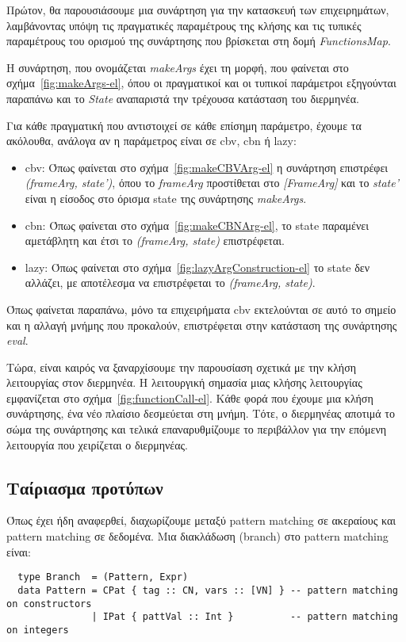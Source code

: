 \documentclass[diploma]{softlab-thesis}
\begin{document}
  
Πρώτον, θα παρουσιάσουμε μια συνάρτηση για την κατασκευή των επιχειρημάτων, λαμβάνοντας υπόψη τις πραγματικές παραμέτρους της κλήσης
και τις τυπικές παραμέτρους του ορισμού της συνάρτησης που βρίσκεται στη δομή \textit{FunctionsMap}.

  
Η συνάρτηση, που ονομάζεται \textit{makeArgs} έχει τη μορφή, που φαίνεται στο σχήμα~\ref{fig:makeArgs-el},
όπου οι πραγματικοί και οι τυπικοί παράμετροι εξηγούνται παραπάνω και το \textit{State} αναπαριστά την τρέχουσα κατάσταση του διερμηνέα.

Για κάθε πραγματική που αντιστοιχεί σε κάθε επίσημη παράμετρο, έχουμε τα ακόλουθα, ανάλογα
αν η παράμετρος είναι σε cbv, cbn ή lazy:
\begin{itemize}
\item cbv: Όπως φαίνεται στο σχήμα~\ref{fig:makeCBVArg-el} η συνάρτηση επιστρέφει \textit{(frameArg, state')}, όπου το
\textit{frameArg} προστίθεται στο \textit{[FrameArg]} και το \textit{state'} είναι η είσοδος στο όρισμα state της συνάρτησης
\textit{makeArgs}.
\item cbn: Όπως φαίνεται στο σχήμα~\ref{fig:makeCBNArg-el}, το state παραμένει αμετάβλητη και έτσι το  
\textit{(frameArg, state)} επιστρέφεται.
\item lazy: Όπως φαίνεται στο σχήμα~\ref{fig:lazyArgConstruction-el} το state δεν αλλάζει, με αποτέλεσμα  
να επιστρέφεται το \textit{(frameArg, state)}.
\end{itemize}
  
Όπως φαίνεται παραπάνω, μόνο τα επιχειρήματα cbv εκτελούνται σε αυτό το σημείο και η αλλαγή μνήμης που προκαλούν,
επιστρέφεται στην κατάσταση της συνάρτησης \textit{eval}.

Τώρα, είναι καιρός να ξαναρχίσουμε την παρουσίαση σχετικά με την κλήση λειτουργίας στον διερμηνέα.
Η λειτουργική σημασία μιας κλήσης λειτουργίας εμφανίζεται στο σχήμα~\ref{fig:functionCall-el}.
Κάθε φορά που έχουμε μια κλήση συνάρτησης, ένα νέο πλαίσιο δεσμεύεται στη μνήμη. Τότε, ο διερμηνέας
αποτιμά το σώμα της συνάρτησης και τελικά επαναρυθμίζουμε το περιβάλλον για την επόμενη λειτουργία που
χειρίζεται ο διερμηνέας. 

%
\subsection{Ταίριασμα προτύπων}

Όπως έχει ήδη αναφερθεί, διαχωρίζουμε μεταξύ pattern matching σε ακεραίους και pattern matching σε δεδομένα.
Μια διακλάδωση (branch) στο pattern matching είναι:
\begin{verbatim}
  type Branch  = (Pattern, Expr)
  data Pattern = CPat { tag :: CN, vars :: [VN] } -- pattern matching on constructors 
               | IPat { pattVal :: Int }          -- pattern matching on integers 
\end{verbatim}
\end{document}
